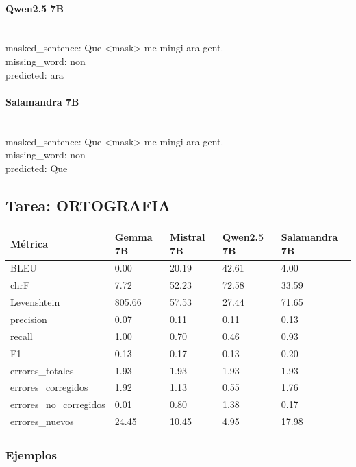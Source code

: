 \paragraph{Qwen2.5 7B}~\\
{masked\_sentence:} Que {\textless}mask{\textgreater} me mingi ara gent.\\
{missing\_word:} non\\
{predicted:} ara\\

\paragraph{Salamandra 7B}~\\
{masked\_sentence:} Que {\textless}mask{\textgreater} me mingi ara gent.\\
{missing\_word:} non\\
{predicted:} Que\\

\subsection{Tarea: ORTOGRAFIA}\label{tarea-ortografia}
{\def\LTcaptype{none}
\begin{longtable}[]{@{}lllll@{}}
\toprule\noalign{}
Métrica & Gemma 7B & Mistral 7B & Qwen2.5 7B & Salamandra 7B \\
\midrule\noalign{}
\endhead
\bottomrule\noalign{}
\endlastfoot
BLEU & 0.00 & 20.19 & 42.61 & 4.00 \\
chrF & 7.72 & 52.23 & 72.58 & 33.59 \\
Levenshtein & 805.66 & 57.53 & 27.44 & 71.65 \\
precision & 0.07 & 0.11 & 0.11 & 0.13 \\
recall & 1.00 & 0.70 & 0.46 & 0.93 \\
F1 & 0.13 & 0.17 & 0.13 & 0.20 \\
errores\_totales & 1.93 & 1.93 & 1.93 & 1.93 \\
errores\_corregidos & 1.92 & 1.13 & 0.55 & 1.76 \\
errores\_no\_corregidos & 0.01 & 0.80 & 1.38 & 0.17 \\
errores\_nuevos & 24.45 & 10.45 & 4.95 & 17.98 \\
\end{longtable}}

\subsubsection{Ejemplos}

